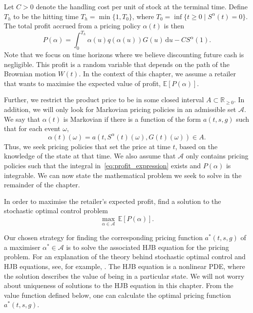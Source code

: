 \documentclass[main.tex]{subfiles}
\begin{document}
Let $C>0$ denote the handling cost per unit of stock at the terminal
time. Define $T_h$ to be the hitting time $T_h=\min \{1, T_0\}$, where
$T_0=\inf\{t\geq 0\mid S^\alpha(t)=0\}$.
The total profit accrued from a pricing policy $\alpha(t)$ is then
\begin{equation}\label{eq:profit_expression}
  P(\alpha) = \int_0^{T_h}\alpha(u)q(\alpha(u))G(u)\,\mathrm{d}u - CS^\alpha(1).
\end{equation}
Note that we focus on time horizons where we believe discounting
future cash is negligible.
This profit is a random variable that depends on the path of the
Brownian motion $W(t)$. %
In the context of this chapter, we assume a retailer that
wants to maximise the expected value of profit, $\mathbb
E[P(\alpha)]$.

Further, we restrict the product price to be in some closed  interval
$A\subset\mathbb R_{\geq 0}$.
In addition, we will only look for Markovian pricing policies in an
admissible set $\mathcal A$. We say that $\alpha(t)$ is Markovian if
there is a function of the form $a(t,s,g)$ such that for each event $\omega$,
\begin{equation}
  \alpha(t)(\omega) = a(t,S^\alpha(t)(\omega), G(t)(\omega)) \in A.
\end{equation}
Thus, we seek pricing policies that set the price at time $t$, based
on the knowledge of the state at that time. We also assume that
$\mathcal A$ only contains pricing policies such that the integral
in~\eqref{eq:profit_expression} exists and
$P(\alpha)$ is integrable. We can now state the mathematical problem we
seek to solve in the remainder of the chapter.
\begin{mydef}
  In order to maximise the retailer's expected profit, find a solution to
  the stochastic optimal control problem
  \begin{equation}\label{eq:pricing_problem}
    \max_{\alpha\in \mathcal A}\,\mathbb E[P(\alpha)].
  \end{equation}
\end{mydef}
Our chosen strategy for finding the corresponding pricing function $a^*(t,s,g)$
of a maximiser $\alpha^*\in\mathcal A$ is to solve the associated HJB
equation for the pricing problem.
For an explanation of the theory behind stochastic optimal control and
HJB equations, see, for example, \citet{pham2009continuous}.
The HJB equation is a nonlinear PDE, where the solution describes the
value of being in a particular state. We will not worry about
uniqueness of solutions to the HJB equation in this chapter. From the
value function defined below, one can
calculate the optimal pricing function $a^*(t,s,g)$.
\end{document}
